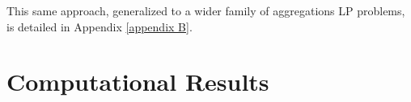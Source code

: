 \documentclass[smallextended,natbib]{svjour3}       %
\numberwithin{definition}{section}
\numberwithin{theorem}{section}
\numberwithin{proposition}{section}
\begin{document}
This same approach, generalized to a wider family of aggregations LP problems, is detailed in Appendix \ref{appendix B}.

























\section{Computational Results}\label{section: comp res}



\end{document}
